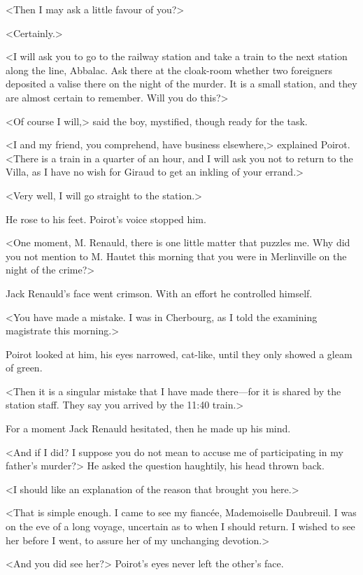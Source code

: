  <Then I may ask a little favour of you?> 

 <Certainly.> 

 <I will ask you to go to the railway station and take a train to the next station along the line, Abbalac. Ask there at the cloak-room whether two foreigners deposited a valise there on the night of the murder. It is a small station, and they are almost certain to remember. Will you do this?> 

 <Of course I will,> said the boy, mystified, though ready for the task. 

 <I and my friend, you comprehend, have business elsewhere,> explained Poirot. <There is a train in a quarter of an hour, and I will ask you not to return to the Villa, as I have no wish for Giraud to get an inkling of your errand.> 

 <Very well, I will go straight to the station.> 

 He rose to his feet. Poirot's voice stopped him. 

 <One moment, M. Renauld, there is one little matter that puzzles me. Why did you not mention to M. Hautet this morning that you were in Merlinville on the night of the crime?> 

 Jack Renauld's face went crimson. With an effort he controlled himself. 

 <You have made a mistake. I was in Cherbourg, as I told the examining magistrate this morning.> 

 Poirot looked at him, his eyes narrowed, cat-like, until they only showed a gleam of green. 

 <Then it is a singular mistake that I have made there—for it is shared by the station staff. They say you arrived by the 11:40 train.> 

 For a moment Jack Renauld hesitated, then he made up his mind. 

 <And if I did? I suppose you do not mean to accuse me of participating in my father's murder?> He asked the question haughtily, his head thrown back. 

 <I should like an explanation of the reason that brought you here.> 

 <That is simple enough. I came to see my fiancée, Mademoiselle Daubreuil. I was on the eve of a long voyage, uncertain as to when I should return. I wished to see her before I went, to assure her of my unchanging devotion.> 

 <And you did see her?> Poirot's eyes never left the other's face. 

